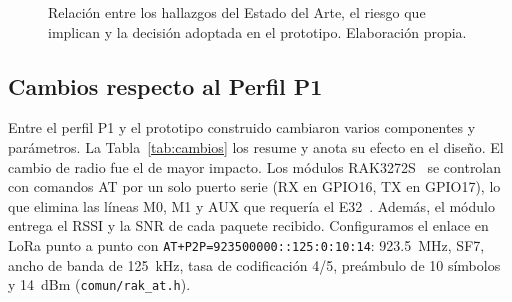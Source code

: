 \begin{figure}[htbp]
{%
}
\caption{Relación entre los hallazgos del Estado del Arte, el riesgo que implican y la decisión adoptada en el prototipo. Elaboración propia.}
\label{fig:eda}
\end{figure}

\subsection{Cambios respecto al Perfil P1}
\label{sec:cambios}

Entre el perfil P1 y el prototipo construido cambiaron varios componentes y parámetros. La Tabla~\ref{tab:cambios} los resume y anota su efecto en el diseño. El cambio de radio fue el de mayor impacto. Los módulos RAK3272S~\cite{rak3172} se controlan con comandos AT por un solo puerto serie (RX en GPIO16, TX en GPIO17), lo que elimina las líneas M0, M1 y AUX que requería el E32~\cite{ebyteE32}. Además, el módulo entrega el RSSI y la SNR de cada paquete recibido. Configuramos el enlace en LoRa punto a punto con \texttt{AT+P2P=923500000::125:0:10:14}: 923.5~MHz, SF7, ancho de banda de 125~kHz, tasa de codificación 4/5, preámbulo de 10 símbolos y 14~dBm (\texttt{comun/rak\_at.h}).

